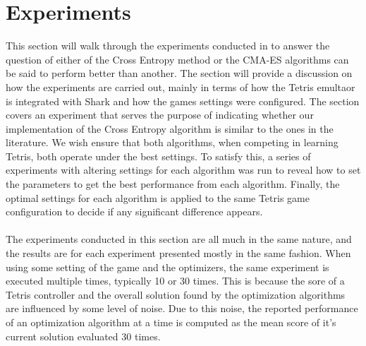 \section{Experiments}


This section will walk through the experiments conducted in to answer the question 
of either of the Cross Entropy method or the CMA-ES algorithms can be said to perform better
than another. The section will provide a discussion on how the experiments are carried out, mainly
in terms of how the Tetris emultaor is integrated with Shark and how the games settings were configured.
The section covers an experiment that serves the purpose of indicating whether our implementation 
of the Cross Entropy algorithm is similar to the ones in the literature. 
We wish ensure that both algorithms, when competing in learning Tetris, both operate under the 
best settings. To satisfy this, a series of experiments with altering settings for each 
algorithm was run to reveal how to set the parameters to get the best performance from 
each algorithm. Finally, the optimal settings for each algorithm is applied to
the same Tetris game configuration to decide if any significant difference appears.\\
\\
The experiments conducted in this section are all much in the same nature, and the 
results are for each experiment presented mostly in the same fashion. When using some setting 
of the game and the optimizers, the same experiment is executed multiple times, typically 
10 or 30 times. This is because the sore of a Tetris controller and the overall 
solution found by the optimization algorithms are influenced by some level of noise.
Due to this noise, the reported performance of an optimization algorithm at a time
is computed as the mean score of it's current solution evaluated 30 times.















